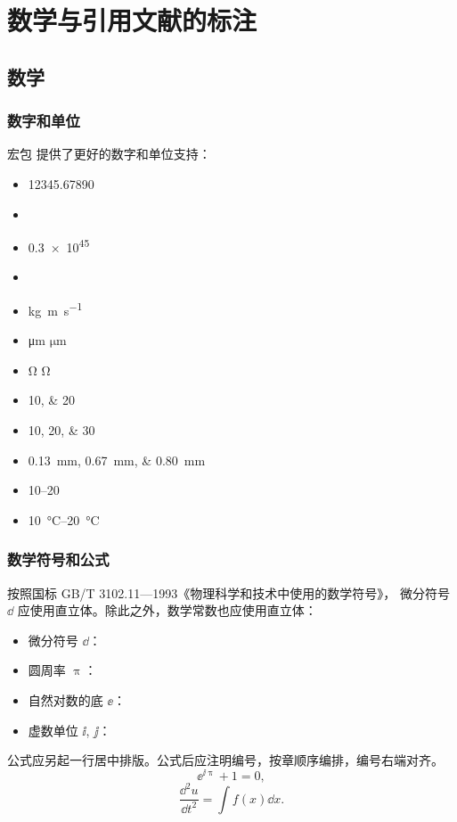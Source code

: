 \documentclass{sjtureport}
\begin{document}
\chapter{数学与引用文献的标注}

\section{数学}

\subsection{数字和单位}

宏包  提供了更好的数字和单位支持：
\begin{itemize}
	\item \num{12345.67890}
	\item {}
	\item \num{.3e45}
	\item {}
	\item \unit{kg.m.s^{-1}}
	\item \unit{\micro\meter} $\unit{\micro\meter}$
	\item \unit{\ohm} $\unit{\ohm}$
	\item \numlist{10;20}
	\item \numlist{10;20;30}
	\item \qtylist{0.13;0.67;0.80}{\milli\metre}
	\item \numrange{10}{20}
	\item \qtyrange{10}{20}{\degreeCelsius}
\end{itemize}

\subsection{数学符号和公式}

按照国标 GB/T 3102.11—1993《物理科学和技术中使用的数学符号》，
微分符号 $\dd$ 应使用直立体。除此之外，数学常数也应使用直立体：
\begin{itemize}
	\item 微分符号 $\dd$：
	\item 圆周率 $\uppi$：
	\item 自然对数的底 $\ee$：
	\item 虚数单位 $\ii$, $\jj$： 
\end{itemize}

公式应另起一行居中排版。公式后应注明编号，按章顺序编排，编号右端对齐。
\begin{equation}
	\ee^{\ii\uppi} + 1 = 0,
\end{equation}
\begin{equation}
	\frac{\dd^2 u}{\dd t^2} = \int f(x) \dd x.
\end{equation}
\end{document}
